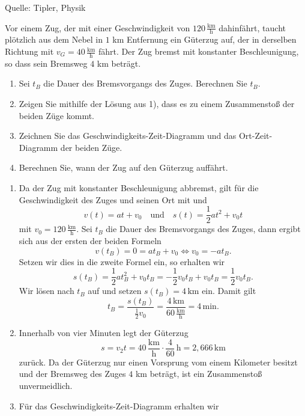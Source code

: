 \begin{MExercises}
\begin{MExercise}
\begin{MSolution}
     \end{MSolution}
     
     Quelle: Tipler, Physik
     \end{MExercise}
     
     \begin{MExercise}
     Vor einem Zug, der mit einer Geschwindigkeit von $120 \,\frac{\text{km}}{\text{h}}$ dahinf\"ahrt, taucht pl\"otzlich
     aus dem Nebel in $1$ km Entfernung ein G\"uterzug auf, der in derselben Richtung mit $v_G=40\, \frac{\text{km}}{\text{h}}$ f\"ahrt.
     Der Zug bremst mit konstanter Beschleunigung, so dass sein Bremsweg $4$ km betr\"agt.
     \begin{enumerate}
     \item Sei $t_B$ die Dauer des Bremsvorgangs des Zuges. Berechnen Sie $t_B$.
     \item Zeigen Sie mithilfe der L\"osung aus 1), dass es zu einem Zusammensto{\ss} der beiden Z\"uge kommt.
     \item Zeichnen Sie das Geschwindigkeits-Zeit-Diagramm und das Ort-Zeit-Diagramm der beiden Z\"uge.
     \item Berechnen Sie, wann der Zug auf den G\"uterzug auff\"ahrt.
     \end{enumerate}
     
     \begin{MSolution}
     \begin{enumerate}
     \item  Da der Zug mit konstanter Beschleunigung abbremst, gilt f\"ur die Geschwindigkeit des Zuges und seinen Ort mit  und 
     $$
     v(t)=a t+v_0 \quad\text{und}\quad 
     s(t)=\frac{1}{2}a t^2+v_0 t
     $$ mit $v_0=120\,\frac{\text{km}}{\text{h}}$. Sei $t_B$ die Dauer des Bremsvorgangs des Zuges, dann ergibt sich aus der ersten der beiden Formeln 
     $$
     v(t_B)=0=a t_B+v_0\Leftrightarrow v_0=-at_B. 
     $$ Setzen wir dies in die zweite Formel ein, so erhalten wir
     $$
     s(t_B)=\frac{1}{2}at_B^2+v_0 t_B=-\frac{1}{2}v_0t_B+v_0t_B=\frac{1}{2}v_0t_B.
     $$
     Wir l\"osen nach $t_B$ auf und setzen $s(t_B)=4\,\text{km}$ ein. Damit gilt
      $$
     t_B=\frac{s(t_B)}{\frac{1}{2}v_0}=\frac{4\,\text{km}}{60\,\frac{\text{km}}{\text{h}}}=4 \,\text{min}.
      $$
      \item Innerhalb von vier Minuten legt der G\"uterzug 
      $$
      s=v_2t=40 \,\frac{\text{km}}{\text{h}}\cdot \frac{4}{60}\,\text{h}= {2,666} \,\text{km}
      $$ zur\"uck. Da der G\"uterzug nur einen Vorsprung vom einem Kilometer besitzt und der Bremsweg des Zuges $4$ km betr\"agt, ist ein Zusammensto{\ss} unvermeidlich.
      \item F\"ur das Geschwindigkeits-Zeit-Diagramm erhalten wir
      

\end{enumerate}
\end{MSolution}
\end{MExercise}
\end{MExercises}
